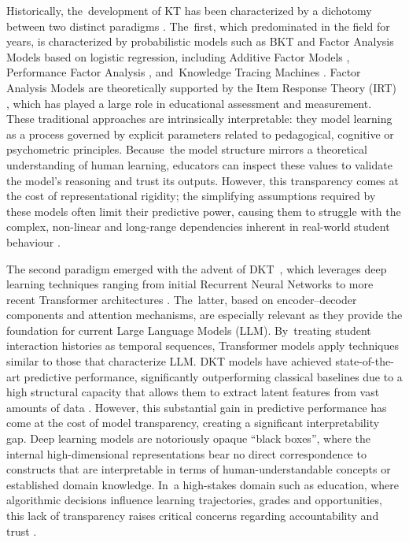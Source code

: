 \documentclass[applsci,article,accept,moreauthors,pdftex]{Definitions/mdpi}
\begin{document}
{Historically, the~development of KT has been characterized by a dichotomy between two distinct paradigms {\citep{abdelrahman2023knowledge}}. The~first, which predominated in the field for years, is characterized by probabilistic models such as BKT {\citep{corbett1994knowledge}} and Factor Analysis Models based on logistic regression, including Additive Factor Models {\citep{cen2008comparing}}, Performance Factor Analysis {\citep{pavlik2009performance}}, and~Knowledge Tracing Machines {\citep{vie2019knowledge}}. Factor Analysis Models are theoretically supported by the Item Response Theory (IRT) {\citep{embretson2013item}}, which has played a large role in educational assessment and measurement. These traditional approaches are intrinsically interpretable: they model learning as a process governed by explicit parameters related to pedagogical, cognitive or psychometric principles. Because~the model structure mirrors a theoretical understanding of human learning, educators can inspect these values to validate the model's reasoning and trust its outputs. However, this transparency comes at the cost of representational rigidity; the simplifying assumptions required by these models often limit their predictive power, causing them to struggle with the complex, non-linear and long-range dependencies inherent in real-world student behaviour {\citep{twenty_five_years_of_bkt}}.}

{The second paradigm emerged with the advent of DKT~{\citep{piech2015deep}}, which leverages deep learning techniques ranging from initial Recurrent Neural Networks to more recent Transformer architectures {\citep{vaswani2017attention}}. The~latter, based on encoder--decoder components and attention mechanisms, are especially relevant as they provide the foundation for current Large Language Models (LLM). By~treating student interaction histories as temporal sequences, Transformer models apply techniques similar to those that characterize LLM. DKT models have achieved state-of-the-art predictive performance, significantly outperforming classical baselines due to a high structural capacity that allows them to extract latent features from vast amounts of data {\citep{abdelrahman2023knowledge}}. However, this substantial gain in predictive performance has come at the cost of model transparency, creating a significant interpretability gap. Deep learning models are notoriously opaque ``black boxes'', where the internal high-dimensional representations bear no direct correspondence to constructs that are interpretable in terms of human-understandable concepts or established domain knowledge. In~a high-stakes domain such as education, where algorithmic decisions influence learning trajectories, grades and opportunities, this lack of transparency raises critical concerns regarding accountability and trust {\citep{Holmes2022504}}.}
\end{document}
